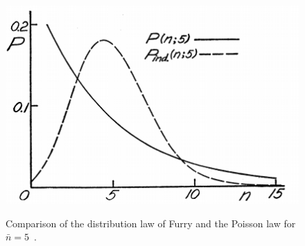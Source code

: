 	\begin{figure}[H]
		\centering
		\includegraphics[width = 0.7\plotwidth]{fig/chapt4/Furry.png}\\
		\caption{\label{fig:furry} Comparison of the distribution law of Furry and the Poisson law for $\bar{n} = 5$~\cite{FURRY1937}.}
	\end{figure}
	
